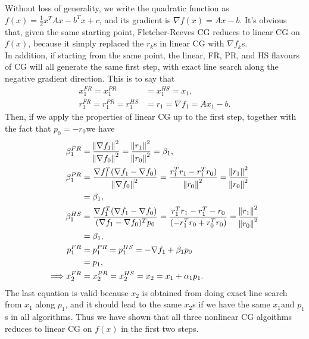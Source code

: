 \documentclass[11pt]{article}
\begin{document}
\maketitle
\section{}
Without loss of generality, we write the quadratic function as $f(x) = \frac12 x^TAx - b^Tx + c$, and its gradient is $\nabla f(x) = A x - b$. It's obvious that, given the same starting point, Fletcher-Reeves CG reduces to linear CG on $f(x)$, because it simply replaced the $r_k$s in linear CG with $\nabla f_k$s.\\[0.3cm]
In addition, if starting from the same point, the linear, FR, PR, and HS flavours of CG will all generate the same first step, with exact line search along the negative gradient direction. This is to say that 
\begin{equation}\begin{split} 
x_1^{FR} = x_1^{PR} &= x_1^{HS} = x_1, \\
r_1^{FR} = r_1^{PR} = r_1^{HS} &= r_1 = \nabla f_1 = Ax_1 - b.
\end{split}\nonumber\end{equation}
Then, if we apply the properties of linear CG up to the first step, together with the fact that $p_0 = -r_0$we have  
\begin{equation}\begin{split} 
\beta^{FR}_1 &= \frac{\norm{\nabla f_1}^2}{\norm{\nabla f_0}^2} = \frac{\norm{r_1}^2}{\norm{r_0}^2} = \beta_1, \\
\beta^{PR}_1 &= \frac{\nabla f_1^T(\nabla f_1 - \nabla f_0)}{\norm{\nabla f_0}^2} = \frac{r_1^T r_1 - r_1^T r_0)}{\norm{r_0}^2} = \frac{\norm{r_1}^2}{\norm{r_0}^2} \\
&= \beta_1, \\
\beta^{HS}_1 &= \frac{\nabla f_1^T(\nabla f_1 - \nabla f_0)}{(\nabla f_1 - \nabla f_0)^Tp_0} = \frac{r_1^Tr_1 - r^T_1 - r_0}{(-r_1^Tr_0 + r_0^Tr_0)} 
= \frac{\norm{r_1}^2}{\norm{r_0}^2} \\ 
&= \beta_1,\\
p_1^{FR} &= p_1^{PR} = p_1^{HS} = -\nabla f_1 + \beta_1 p_0\\
&= p_1,\\
\Longrightarrow x_2^{FR} &= x_2^{PR} = x_2^{HS} = x_2 = x_1 + \alpha_1 p_1.
\end{split}\nonumber\end{equation} 
The last equation is valid because $x_2$ is obtained from doing exact line search from $x_1$ along $p_1$, and it should lead to the same $x_2$s if we have the same $x_1$and $p_1$s in all algorithms. Thus we have shown that all three nonlinear CG algoithms reduces to linear CG on $f(x)$ in the first two steps. \\[0.3cm]
\end{document}
